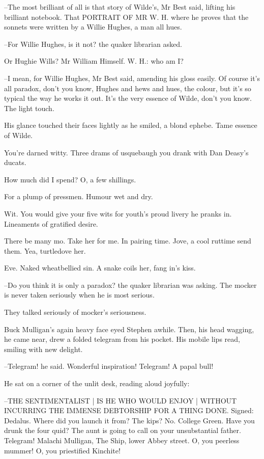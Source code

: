 --The most brilliant of all is that story of Wilde's,
Mr Best said,
lifting his brilliant notebook.
That PORTRAIT OF MR W. H.
where he proves that the sonnets were written by a Willie Hughes,
a man all hues.

--For Willie Hughes,
is it not?
the quaker librarian asked.

Or Hughie Wills?
Mr William Himself.
W. H.:
who am I?

--I mean,
for Willie Hughes,
Mr Best said,
amending his gloss easily.
Of course it's all paradox,
don't you know,
Hughes and hews and hues,
the colour,
but it's so typical the way he works it out.
It's the very essence of Wilde,
don't you know.
The light touch.

His glance touched their faces lightly as he smiled,
a blond ephebe.
Tame essence of Wilde.

You're darned witty.
Three drams of usquebaugh you drank with Dan Deasy's ducats.

How much did I spend?
O, a few shillings.

For a plump of pressmen.
Humour wet and dry.

Wit.
You would give your five wits for youth's proud livery he pranks in.
Lineaments of gratified desire.

There be many mo.
Take her for me.
In pairing time.
Jove, a cool ruttime send them.
Yea, turtledove her.

Eve.
Naked wheatbellied sin.
A snake coils her,
fang in's kiss.

--Do you think it is only a paradox?
the quaker librarian was asking.
The mocker is never taken seriously when he is most serious.

They talked seriously of mocker's seriousness.

Buck Mulligan's again heavy face eyed Stephen awhile.
Then,
his head wagging,
he came near,
drew a folded telegram from his pocket.
His mobile lips read,
smiling with new delight.

--Telegram!
he said.
Wonderful inspiration!
Telegram!
A papal bull!

He sat on a corner of the unlit desk,
reading aloud joyfully:

--THE SENTIMENTALIST |
IS HE WHO WOULD ENJOY |
WITHOUT INCURRING THE IMMENSE DEBTORSHIP FOR A THING DONE.
Signed: Dedalus.
Where did you launch it from?
The kips?
No.
College Green.
Have you drunk the four quid?
The aunt is going to call on your unsubstantial father.
Telegram!
Malachi Mulligan, The Ship, lower Abbey street.
O, you peerless mummer!
O, you priestified Kinchite!

